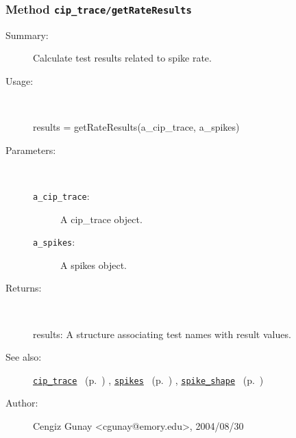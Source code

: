 \subsubsection[Method \texttt{getRateResults}]{Method \texttt{cip\_trace/getRateResults}}%
%
\label{ref_cip_trace__getRateResults}%
\hypertarget{ref_cip_trace__getRateResults}{}%
\begin{description}
\item[Summary:]Calculate test results related to spike rate.
%
\item[Usage:]~%
\begin{lyxcode}%
results = getRateResults(a\_cip\_trace, a\_spikes)
%
\end{lyxcode}%
%
%
\item[Parameters:]~
\begin{description}%
\item[\texttt{a\_cip\_trace}:]
 A cip\_trace object.
\item[\texttt{a\_spikes}:]
 A spikes object.
\end{description}%
%
\item[Returns:]~

	results: A structure associating test names with result values.
%
%
\item[See also:]%
\hyperlink{ref_cip_trace}{\texttt{cip\_trace}}%
\ (p.~\pageref{ref_cip_trace})%
%
, \hyperlink{ref_spikes}{\texttt{spikes}}%
\ (p.~\pageref{ref_spikes})%
%
, \hyperlink{ref_spike_shape}{\texttt{spike\_shape}}%
\ (p.~\pageref{ref_spike_shape})%
%
%
\item[Author:]%
Cengiz Gunay <cgunay@emory.edu>, 2004/08/30%
\end{description}
\methodline%
